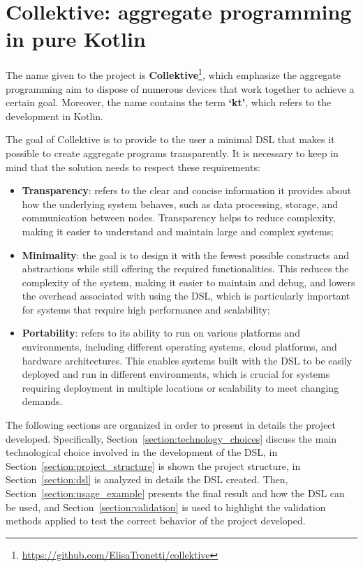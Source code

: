 \chapter{Collektive: aggregate programming in pure Kotlin}\label{chapter:collektive}
The name given to the project is \textbf{Collektive}\footnote{\url{https://github.com/ElisaTronetti/collektive}}, which emphasize the aggregate programming aim to dispose of numerous devices that work together to achieve a certain goal. Moreover, the name contains the term \textbf{`kt'}, which refers to the development in Kotlin.

The goal of Collektive is to provide to the user a minimal DSL that makes it possible to create aggregate programs transparently. It is necessary to keep in mind that the solution needs to respect these requirements:
\begin{itemize}
    \item \textbf{Transparency}: refers to the clear and concise information it provides about how the underlying system behaves, such as data processing, storage, and communication between nodes. Transparency helps to reduce complexity, making it easier to understand and maintain large and complex systems;
    \item \textbf{Minimality}: the goal is to design it with the fewest possible constructs and abstractions while still offering the required functionalities. This reduces the complexity of the system, making it easier to maintain and debug, and lowers the overhead associated with using the DSL, which is particularly important for systems that require high performance and scalability;
    \item \textbf{Portability}: refers to its ability to run on various platforms and environments, including different operating systems, cloud platforms, and hardware architectures. This enables systems built with the DSL to be easily deployed and run in different environments, which is crucial for systems requiring deployment in multiple locations or scalability to meet changing demands.
\end{itemize}

The following sections are organized in order to present in details the project developed. Specifically, Section~\ref{section:technology_choices} discuss the main technological choice involved in the development of the DSL, in Section~\ref{section:project_structure} is shown the project structure, in Section~\ref{section:dsl} is analyzed in details the DSL created. Then, Section~\ref{section:usage_example} presents the final result and how the DSL can be used, and Section~\ref{section:validation} is used to highlight the validation methods applied to test the correct behavior of the project developed.

